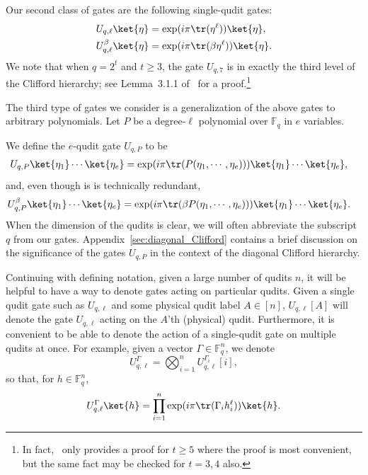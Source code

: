 \documentclass[11pt]{article}
\theoremstyle{definition}
\renewcommand{\ge}{\geqslant}
\newcommand{\FF}{\mathbb{F}}
\begin{document}
Our second class of gates are the following single-qudit gates:
\begin{align}\label{eq:Uql_defn}
    U_{q,\ell}\ket{\eta} &= \exp(i\pi\tr(\eta^\ell))\ket{\eta}, \\
    U_{q,\ell}^\beta\ket{\eta} &= \exp(i\pi\tr(\beta\eta^\ell))\ket{\eta}.
\end{align}
We note that when $q = 2^t$ and $t\ge 3$, the gate $U_{q,7}$ is in exactly the third level of the Clifford hierarchy; see Lemma~3.1.1 of~\cite{wills2024constant} for a proof.\footnote{In fact,~\cite{wills2024constant} only provides a proof for $t \ge 5$ where the proof is most convenient, but the same fact may be checked for $t=3,4$ also.}

The third type of gates we consider is a generalization of the above gates to arbitrary polynomials.
Let $P$ be a degree-$\ell$ polynomial over $\mathbb{F}_q$ in $e$ variables.

We define the $e$-qudit gate $U_{q,P}$ to be
\begin{align}
    U_{q,P}\ket{\eta_1}\cdots \ket{\eta_e}
    &= \exp(i\pi\tr(P(\eta_1, \cdots, \eta_e))) \ket{\eta_1}\cdots \ket{\eta_e},
\end{align}
and, even though is is technically redundant,
\begin{align}               
    U_{q,P}^\beta\ket{\eta_1}\cdots \ket{\eta_e}
    &= \exp(i\pi\tr( \beta P(\eta_1, \cdots, \eta_e))) \ket{\eta_1}\cdots \ket{\eta_e}.
\end{align}
When the dimension of the qudits is clear, we will often abbreviate the subscript $q$ from our gates. Appendix~\ref{sec:diagonal_Clifford} contains a brief discussion on the significance of the gates $U_{q,P}$ in the context of the diagonal Clifford hierarchy.

Continuing with defining notation, given a large number of qudits $n$, it will be helpful to have a way to denote gates acting on particular qudits. Given a single qudit gate such as $U_{q,\ell}$ and some physical qudit label $A \in [n]$, $U_{q,\ell}[A]$ will denote the gate $U_{q,\ell}$ acting on the $A$'th (physical) qudit. Furthermore, it is convenient to be able to denote the action of a single-qudit gate on multiple qudits at once. For example, given a vector $\Gamma\in \FF_q^n$, we denote
\begin{equation}
    U_{q,\ell}^\Gamma = \bigotimes_{i=1}^n U_{q,\ell}^{\Gamma_i}[i],
\end{equation}
so that, for $h \in \mathbb{F}_q^n$,
\begin{equation}
    U_{q,\ell}^\Gamma\ket{h} = \prod_{i=1}^n \exp(i\pi\tr(\Gamma_i h_i^\ell))\ket{h}.
\end{equation}
\end{document}
